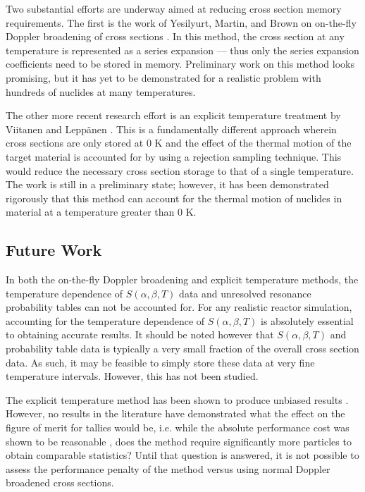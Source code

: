Two substantial efforts are underway aimed at reducing cross section memory
requirements. The first is the work of Yesilyurt, Martin, and Brown on
on-the-fly Doppler broadening of cross sections \cite{nse-yesilyurt-2012,
  trans-brown-2012}. In this method, the cross section at any temperature is
represented as a series expansion --- thus only the series expansion
coefficients need to be stored in memory. Preliminary work on this method looks
promising, but it has yet to be demonstrated for a realistic problem with
hundreds of nuclides at many temperatures.

The other more recent research effort is an explicit temperature treatment by
Viitanen and Leppänen \cite{nse-viitanen-2012}. This is a fundamentally
different approach wherein cross sections are only stored at 0 K and the effect
of the thermal motion of the target material is accounted for by using a
rejection sampling technique. This would reduce the necessary cross section
storage to that of a single temperature. The work is still in a preliminary
state; however, it has been demonstrated rigorously that this method can account
for the thermal motion of nuclides in material at a temperature greater than 0
K.

\subsection{Future Work}

In both the on-the-fly Doppler broadening and explicit temperature methods, the
temperature dependence of $S(\alpha,\beta,T)$ data and unresolved resonance
probability tables can not be accounted for. For any realistic reactor
simulation, accounting for the temperature dependence of $S(\alpha,\beta,T)$ is
absolutely essential to obtaining accurate results. It should be noted however
that $S(\alpha,\beta,T)$ and probability table data is typically a very small
fraction of the overall cross section data. As such, it may be feasible to
simply store these data at very fine temperature intervals. However, this has
not been studied.

The explicit temperature method has been shown to produce unbiased results
\cite{nse-viitanen-2012}. However, no results in the literature have
demonstrated what the effect on the figure of merit for tallies would be,
i.e. while the absolute performance cost was shown to be reasonable
\cite{physor-viitanen-2012}, does the method require significantly more
particles to obtain comparable statistics? Until that question is answered, it
is not possible to assess the performance penalty of the method versus using
normal Doppler broadened cross sections.

